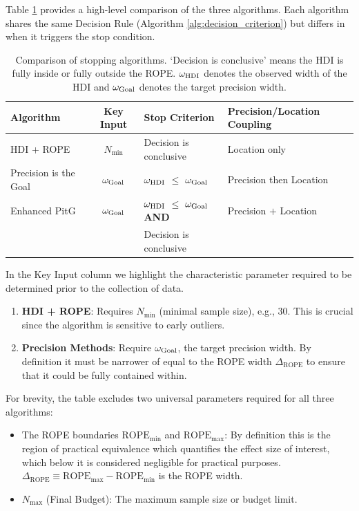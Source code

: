 Table \ref{tab:comparison} provides a high-level comparison of the three algorithms. Each algorithm shares the same Decision Rule (Algorithm \ref{alg:decision_criterion}) but differs in when it triggers the stop condition.

\begin{table}[h!]
    \begin{center}
      \begin{tabular}{l|c|l|l}
        \textbf{Algorithm} & \textbf{Key Input} & \textbf{Stop Criterion} &  \textbf{Precision/Location Coupling} \\
        \hline
        HDI + ROPE & $N_\mathrm{min}$ & Decision is conclusive & Location only \\
        Precision is the Goal & $\omega_{\rm Goal}$ & $\omega_{\rm HDI}$ $\le$ $\omega_{\rm Goal}$ & Precision then Location \\
        Enhanced PitG & $\omega_{\rm Goal}$ & $\omega_{\rm HDI}$ $\le$ $\omega_{\rm Goal}$ \textbf{AND} & Precision $+$ Location \\
         & & Decision is conclusive & \\
      \end{tabular}
      \caption{Comparison of stopping algorithms. `Decision is conclusive' means the HDI
      is fully inside or fully outside the ROPE. $\omega_{\rm HDI}$ denotes the observed
      width of the HDI and $\omega_{\rm Goal}$ denotes the target precision width.}
      \label{tab:comparison}
    \end{center}
  \end{table}

In the Key Input column we highlight the characteristic parameter required to be determined prior to the collection of data.
\begin{enumerate}
    \item \textbf{HDI + ROPE}: Requires $N_\mathrm{min}$ (minimal sample size), e.g., 30. This is crucial since the algorithm is sensitive to early outliers.
    \item \textbf{Precision Methods}: Require $\omega_{\rm Goal}$, the target precision width.
    By definition it must be narrower of equal to the ROPE width $\Delta_\mathrm{ROPE}$ to ensure
    that it could be fully contained within.
\end{enumerate}

For brevity, the table excludes two universal parameters required for all three algorithms:
\begin{itemize}
    \item The ROPE boundaries $\mathrm{ROPE}_\mathrm{min}$ and $\mathrm{ROPE}_\mathrm{max}$: By definition
    this is the region of practical equivalence which quantifies the effect size of interest,
    which below it is considered negligible for practical purposes.
    $\Delta_\mathrm{ROPE} \equiv \mathrm{ROPE}_\mathrm{max} - \mathrm{ROPE}_\mathrm{min}$ is the ROPE width.
    \item $N_\mathrm{max}$ (Final Budget): The maximum sample size or budget limit.
\end{itemize}

